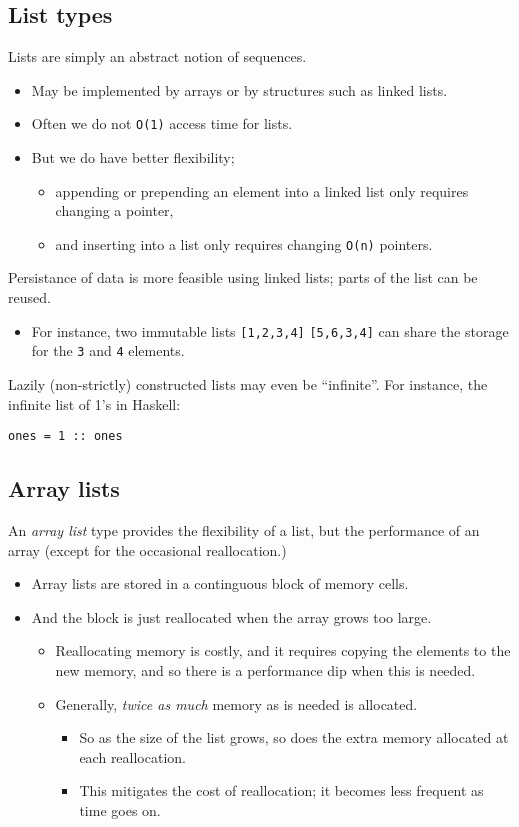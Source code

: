 \documentclass[11pt]{article}
\theoremstyle{definition}
\begin{document}
\subsection{List types}
\label{sec:org39f3a2e}

Lists are simply an abstract notion of sequences.
\begin{itemize}
\item May be implemented by arrays or by structures such as linked lists.
\item Often we do not \texttt{O(1)} access time for lists.
\item But we do have better flexibility;
\begin{itemize}
\item appending or prepending an element into a linked list
only requires changing a pointer,
\item and inserting into a list only requires changing \texttt{O(n)} pointers.
\end{itemize}
\end{itemize}

Persistance of data is more feasible using linked lists;
parts of the list can be reused.
\begin{itemize}
\item For instance, two immutable lists \texttt{[1,2,3,4]} \texttt{[5,6,3,4]} can share
the storage for the \texttt{3} and \texttt{4} elements.
\end{itemize}

Lazily (non-strictly) constructed lists may even be “infinite”.
For instance, the infinite list of 1's in Haskell:
\begin{verbatim}
ones = 1 :: ones
\end{verbatim}

\subsection{Array lists}
\label{sec:orgc14bfb5}

An \emph{array list} type provides the flexibility of a list,
but the performance of an array (except for the occasional reallocation.)
\begin{itemize}
\item Array lists are stored in a continguous block of memory cells.
\item And the block is just reallocated when the array grows too large.
\begin{itemize}
\item Reallocating memory is costly,
and it requires copying the elements to the new memory,
and so there is a performance dip when this is needed.
\item Generally, \emph{twice as much} memory as is needed is allocated.
\begin{itemize}
\item So as the size of the list grows, so does the extra memory allocated
at each reallocation.
\item This mitigates the cost of reallocation; it becomes less frequent
as time goes on.
\end{itemize}
\end{itemize}
\end{itemize}
\end{document}
